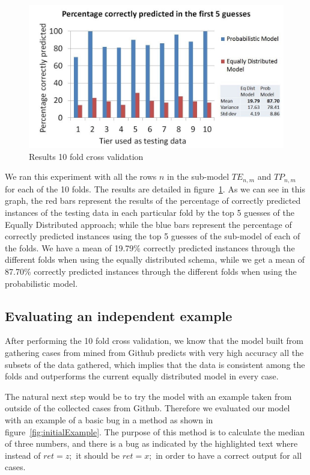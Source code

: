 \documentclass[conference]{IEEEtran}
\begin{document}
\begin{figure}[!h]
  \centering
    \includegraphics[scale=0.33]{sanity1}
  \caption{Results 10 fold cross validation}
  \label{fig:results10fcv}
\end{figure}

We ran this experiment with all the rows $n$ in the sub-model $TE_{n,m}$ and 
$TP_{n,m}$ for each of the 10 
folds. The results are detailed in figure~\ref{fig:results10fcv}. As we can see 
in this graph, the red bars represent the results of the percentage of correctly 
predicted instances of the testing data in each particular fold by the top 5 guesses of the Equally Distributed approach; while the blue 
bars represent the percentage of correctly predicted instances using the top 5 
guesses of the sub-model of each of the folds. We have a mean of 19.79\% 
correctly predicted instances through the different folds when using the equally 
distributed schema, while we get a mean of 87.70\% correctly predicted instances 
through the different folds when using the probabilistic model. 

\subsection{Evaluating an independent example}
After performing the 10 fold cross validation, we know that the model built from 
gathering cases from mined from Github predicts with very high accuracy all the 
subsets of the data gathered, which implies that the data is consistent among 
the folds and outperforms the current equally distributed model in every case. 

The natural next step would be to try the model with an example taken from 
outside of the collected cases from Github. Therefore we evaluated our model 
with an example of a basic bug in a method as shown in figure~\ref{fig:initialExample}. The purpose of this method is to calculate the median 
of three numbers, and there is a bug as indicated by the highlighted text where 
instead of $ret = z;$ it should be $ret = x;$ in order to have a correct output 
for all cases.
\end{document}
